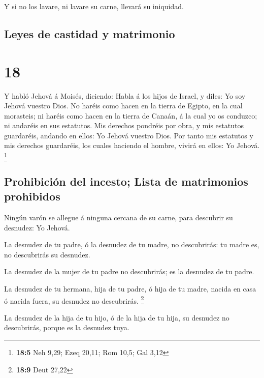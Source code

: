  Y si no los lavare, ni lavare su carne, llevará su
iniquidad.

\hypertarget{leyes-de-castidad-y-matrimonio}{%
\subsection{Leyes de castidad y
matrimonio}\label{leyes-de-castidad-y-matrimonio}}

\hypertarget{section-17}{%
\section{18}\label{section-17}}

 Y habló Jehová á Moisés, diciendo:  Habla á los
hijos de Israel, y diles: Yo soy Jehová vuestro Dios.  No
haréis como hacen en la tierra de Egipto, en la cual morasteis; ni
haréis como hacen en la tierra de Canaán, á la cual yo os conduzco; ni
andaréis en sus estatutos.  Mis derechos pondréis por obra,
y mis estatutos guardaréis, andando en ellos: Yo Jehová vuestro Dios.
 Por tanto mis estatutos y mis derechos guardaréis, los
cuales haciendo el hombre, vivirá en ellos: Yo Jehová. \footnote{\textbf{18:5}
  Neh 9,29; Ezeq 20,11; Rom 10,5; Gal 3,12}

\hypertarget{prohibiciuxf3n-del-incesto-lista-de-matrimonios-prohibidos}{%
\subsection{Prohibición del incesto; Lista de matrimonios
prohibidos}\label{prohibiciuxf3n-del-incesto-lista-de-matrimonios-prohibidos}}

 Ningún varón se allegue á ninguna cercana de su carne, para
descubrir su desnudez: Yo Jehová.

 La desnudez de tu padre, ó la desnudez de tu madre, no
descubrirás: tu madre es, no descubrirás su desnudez.

 La desnudez de la mujer de tu padre no descubrirás; es la
desnudez de tu padre.

 La desnudez de tu hermana, hija de tu padre, ó hija de tu
madre, nacida en casa ó nacida fuera, su desnudez no descubrirás.
\footnote{\textbf{18:9} Deut 27,22}

 La desnudez de la hija de tu hijo, ó de la hija de tu
hija, su desnudez no descubrirás, porque es la desnudez tuya.

